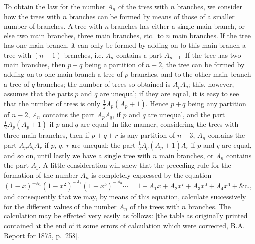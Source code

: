 \documentclass[11pt,a4paper]{book}
\begin{document}
To obtain the law for the number $A_n$ of the trees with $n$ branches, we consider how
the trees with $n$ branches can be formed by means of those of a smaller number of
branches. A tree with $n$ branches has either a single main branch, or else two main
branches, three main branches, etc.\ to $n$ main branches. If the tree has one main
branch, it can only be formed by adding on to this main branch a tree with $(n-1)$
branches, i.e. $A_n$ contains a part $A_{n-1}$. If the tree has two main branches, then
$p + q$ being a partition of $n - 2$, the tree can be formed by adding on to one main
branch a tree of $p$ branches, and to the other main branch a tree of $q$ branches; the
number of trees so obtained is $A_p A_q$; this, however, assumes that the parts $p$ and $q$
are unequal; if they are equal, it is easy to see that the number of trees is only
$\tfrac{1}{2}A_p(A_p + 1)$. Hence $p + q$ being any partition of $n - 2$, $A_n$ contains the part $A_p A_q$,
if $p$ and $q$ are unequal, and the part $\tfrac{1}{2}A_p(A_p + 1)$ if $p$ and $q$ are equal. In like
manner, considering the trees with three main branches, then if $p + q + r$ is any
partition of $n - 3$, $A_n$ contains the part $A_p A_q A_r$ if $p$, $q$, $r$ are unequal; the part
$\tfrac{1}{2}A_p(A_p + 1)A_r$ if $p$ and $q$ are equal, and so on, until lastly we have a single
tree with $n$ main branches, or $A_n$ contains the part $A_1$. A little consideration will
shew that the preceding rule for the formation of the number $A_n$ is completely expressed
by the equation
\[
(1 - x)^{-A_1}(1 - x^2)^{-A_2}(1 - x^3)^{-A_3}\cdots = 1 + A_1 x + A_2 x^2 + A_3 x^3 + A_4 x^4 + \&\textrm{c.},
\]
and consequently that we may, by means of this equation, calculate successively for
the different values of the number $A_n$ of the trees with $n$ branches. The calculation
may be effected very easily as follows: [the table as originally printed contained at the
end of it some errors of calculation which were corrected, B.A. Report for 1875, p.~258].
\end{document}
